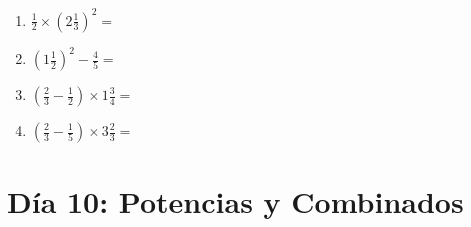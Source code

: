 \documentclass[12pt]{article}
\begin{document}
\begin{enumerate}
\item \large $ \frac{1}{2} \times \left( 2 \frac{1}{3} \right)^2 = $ \vspace{1.6cm}
\item \large $ \left( 1 \frac{1}{2} \right)^2 - \frac{4}{5} = $ \vspace{1.6cm}
\item \large $ \left( \frac{2}{3} - \frac{1}{2} \right) \times 1 \frac{3}{4} = $ \vspace{1.6cm}
\item \large $ \left( \frac{2}{3} - \frac{1}{5} \right) \times 3 \frac{2}{3} = $ \vspace{1.6cm}
\end{enumerate}\newpage
\section*{Día 10: Potencias y Combinados}
\end{document}
